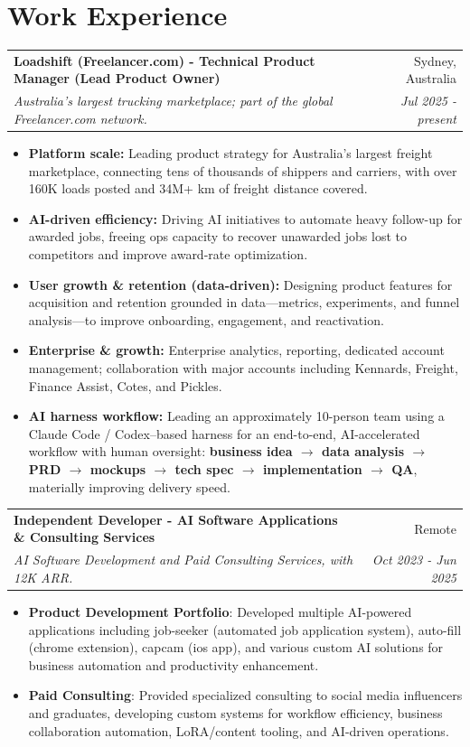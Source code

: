 \documentclass[letterpaper,11pt]{article}
\makeatletter
\newcommand{\resumeItem}[2]{
  \item\small{
    \textbf{#1}{: #2 \vspace{-2pt}}
  }
}
\newcommand{\resumeSubheading}[4]{
  \vspace{-3pt}\item
    \begin{tabular*}{0.97\textwidth}{l@{\extracolsep{\fill}}r}
      \textbf{#1} & #2 \\
      \textit{\small#3} & \textit{\small #4} \\
    \end{tabular*}\vspace{-8pt}
}
\newcommand{\resumeSubHeadingListStart}{}
\newcommand{\resumeItemListStart}{\begin{itemize}}
\newcommand{\resumeItemListEnd}{\end{itemize}\vspace{-8pt}}
\makeatother
\begin{document}
\section{Work Experience}

\resumeSubHeadingListStart
  \resumeSubheading
      {Loadshift (Freelancer.com) - Technical Product Manager (Lead Product Owner)}{Sydney, Australia}
      {Australia's largest trucking marketplace; part of the global Freelancer.com network.}{Jul 2025 - present}
      \resumeItemListStart
      \item {\textbf{Platform scale:}}
      {Leading product strategy for Australia's largest freight marketplace, connecting tens of thousands of shippers and carriers, with over 160K loads posted and 34M+ km of freight distance covered.}
      \vspace{-5pt}
      \item {\textbf{AI-driven efficiency:}}
      {Driving AI initiatives to automate heavy follow-up for awarded jobs, freeing ops capacity to recover unawarded jobs lost to competitors and improve award-rate optimization.}
      \vspace{-5pt}
      \item {\textbf{User growth \& retention (data-driven):}}
      {Designing product features for acquisition and retention grounded in data---metrics, experiments, and funnel analysis---to improve onboarding, engagement, and reactivation.}
      \vspace{-5pt}
      \item {\textbf{Enterprise \& growth:}}
      {Enterprise analytics, reporting, dedicated account management; collaboration with major accounts including Kennards, Freight, Finance Assist, Cotes, and Pickles.}
      \vspace{-5pt}
      \item {\textbf{AI harness workflow:}}
      {Leading an approximately 10-person team using a Claude Code / Codex--based harness for an end-to-end, AI-accelerated workflow with human oversight: \textbf{business idea $\rightarrow$ data analysis $\rightarrow$ PRD $\rightarrow$ mockups $\rightarrow$ tech spec $\rightarrow$ implementation $\rightarrow$ QA}, materially improving delivery speed.}
      \resumeItemListEnd

\vspace{5pt}
\resumeSubheading{Independent Developer - AI Software Applications \& Consulting Services}{Remote}
  {AI Software Development and Paid Consulting Services, with 12K ARR.}{Oct 2023 - Jun 2025}
  \resumeItemListStart
    \resumeItem{Product Development Portfolio}
      {Developed multiple AI-powered applications including job-seeker (automated job application system), auto-fill (chrome extension), capcam (ios app), and various custom AI solutions for business automation and productivity enhancement.}
    \resumeItem{Paid Consulting}
      {Provided specialized consulting to social media influencers and graduates, developing custom systems for workflow efficiency, business collaboration automation, LoRA/content tooling, and AI-driven operations.}
  \resumeItemListEnd
\end{document}
